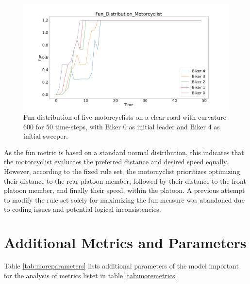 \begin{figure}[h]
    \centering
    \includegraphics[width=1.0\linewidth]{images/fun_distribution_free_road.png}
    \caption{Fun-distribution of five motorcyclists on a clear road with curvature 600 for 50 time-steps, with Biker 0 as initial leader and Biker 4 as initial sweeper.}
    \label{fig:fun_distribution_clear_road}
\end{figure}

As the fun metric is based on a standard normal distribution, this indicates that the motorcyclist evaluates the preferred distance and desired speed equally. However, according to the fixed rule set, the motorcyclist prioritizes optimizing their distance to the rear platoon member, followed by their distance to the front platoon member, and finally their speed, within the platoon. A previous attempt to modify the rule set solely for maximizing the fun measure was abandoned due to coding issues and potential logical inconsistencies.



\section{Additional Metrics and Parameters}
\label{sec:Additional Metrics and Parameters}
Table \ref{tab:moreparameters} lists additional parameters of the model important for the analysis of metrics listet in table \ref{tab:moremetrics}

